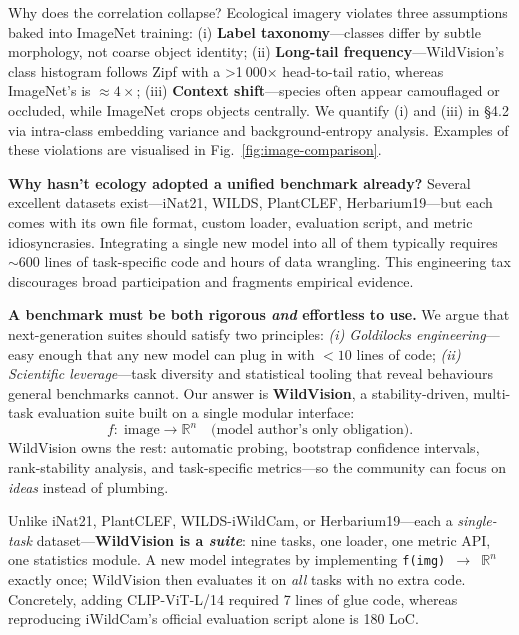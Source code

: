 \documentclass{article}
\begin{document}
Why does the correlation collapse?  Ecological imagery violates three assumptions baked into ImageNet training:  
(i) \textbf{Label taxonomy}—classes differ by subtle morphology, not coarse object identity;  
(ii) \textbf{Long-tail frequency}—WildVision’s class histogram follows Zipf with a >1 000× head-to-tail ratio, whereas ImageNet’s is $\approx4\times$;  
(iii) \textbf{Context shift}—species often appear camouflaged or occluded, while ImageNet crops objects centrally.  
We quantify (i) and (iii) in §4.2 via intra-class embedding variance and background-entropy analysis.
Examples of these violations are visualised in Fig.~\ref{fig:image-comparison}.

\noindent\textbf{Why hasn’t ecology adopted a unified benchmark already?}
Several excellent datasets exist—iNat21, WILDS, PlantCLEF, Herbarium19—but each
comes with its own file format, custom loader, evaluation script, and metric idiosyncrasies.
Integrating a single new model into all of them typically requires
\(\sim\!600\) lines of task-specific code and hours of data wrangling.
This engineering tax discourages broad participation and fragments empirical evidence.



\noindent\textbf{A benchmark must be both rigorous \emph{and} effortless to use.}
We argue that next-generation suites should satisfy two principles:
\emph{(i) Goldilocks engineering}—easy enough that any new model can plug in with
\(<\!10\) lines of code; \emph{(ii) Scientific leverage}—task diversity and
statistical tooling that reveal behaviours general benchmarks cannot.
Our answer is \textbf{WildVision}, a stability-driven, multi-task evaluation suite
built on a single modular interface:
\[
   \boxed{f:\;\text{image} \rightarrow \mathbb{R}^{n}}
   \quad\text{(model author’s only obligation).}
\]
WildVision owns the rest: automatic probing, bootstrap confidence intervals,
rank-stability analysis, and task-specific metrics—so the community can focus on
\emph{ideas} instead of plumbing.

Unlike iNat21, PlantCLEF, WILDS-iWildCam, or Herbarium19—each a \emph{single-task} dataset—\textbf{WildVision is a \emph{suite}}: nine tasks, one loader, one metric API, one statistics module.  
A new model integrates by implementing \texttt{f(img)\,$\rightarrow$\,\(\mathbb{R}^n\)} exactly once; WildVision then evaluates it on \emph{all} tasks with no extra code.  
Concretely, adding CLIP-ViT-L/14 required 7 lines of glue code, whereas reproducing iWildCam’s official evaluation script alone is 180 LoC.
\end{document}
